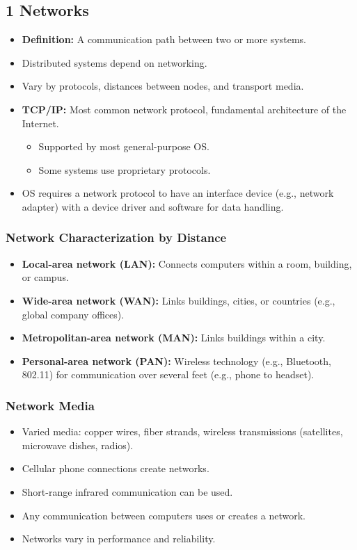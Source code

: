 \documentclass{article}
\begin{document}
\subsection*{1 Networks}
\begin{itemize}
    \item \textbf{Definition:} A communication path between two or more systems.
    \item Distributed systems depend on networking.
    \item Vary by protocols, distances between nodes, and transport media.
    \item \textbf{TCP/IP:} Most common network protocol, fundamental architecture of the Internet.
    \begin{itemize}
        \item Supported by most general-purpose OS.
        \item Some systems use proprietary protocols.
    \end{itemize}
    \item OS requires a network protocol to have an interface device (e.g., network adapter) with a device driver and software for data handling.
\end{itemize}

\subsubsection*{Network Characterization by Distance}
\begin{itemize}
    \item \textbf{Local-area network (LAN):} Connects computers within a room, building, or campus.
    \item \textbf{Wide-area network (WAN):} Links buildings, cities, or countries (e.g., global company offices).
    \item \textbf{Metropolitan-area network (MAN):} Links buildings within a city.
    \item \textbf{Personal-area network (PAN):} Wireless technology (e.g., Bluetooth, 802.11) for communication over several feet (e.g., phone to headset).
\end{itemize}

\subsubsection*{Network Media}
\begin{itemize}
    \item Varied media: copper wires, fiber strands, wireless transmissions (satellites, microwave dishes, radios).
    \item Cellular phone connections create networks.
    \item Short-range infrared communication can be used.
    \item Any communication between computers uses or creates a network.
    \item Networks vary in performance and reliability.
\end{itemize}
\end{document}
